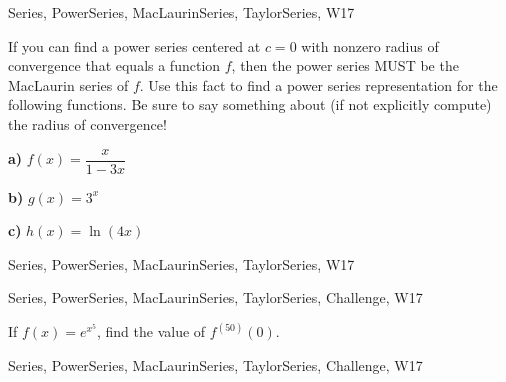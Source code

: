 \begin{tagblock}{Series, PowerSeries, MacLaurinSeries, TaylorSeries, W17}
\begin{question}

If you can find a power series centered at $c=0$ with nonzero radius of convergence that equals a function $f$, then the power series MUST be the MacLaurin series of $f$. Use this fact to find a power series representation for the following functions. Be sure to say something about (if not explicitly compute) the radius of convergence!

\bigskip

\textbf{a)} $f(x)=\dfrac {x}{1-3x}$

\bigskip

\textbf{b)} $g(x)=3^x$

\bigskip

\textbf{c)} $h(x)=\ln(4x)$
	
	
\begin{tags}
	    Series, PowerSeries, MacLaurinSeries, TaylorSeries, W17
\end{tags}
	
\begin{diary}
	    
\end{diary}
	
\begin{solution}
	   
\end{solution}
	
\end{question}

\end{tagblock}

 

\begin{tagblock}{Series, PowerSeries, MacLaurinSeries, TaylorSeries, Challenge, W17}
\begin{question}

If $f(x)=e^{x^5}$, find the value of $f^{(50)}(0)$. 
	
	
\begin{tags}
	    Series, PowerSeries, MacLaurinSeries, TaylorSeries, Challenge, W17
\end{tags}
	
\begin{diary}
	    
\end{diary}
	
\begin{solution}
	   
\end{solution}
	
\end{question}

\end{tagblock}

